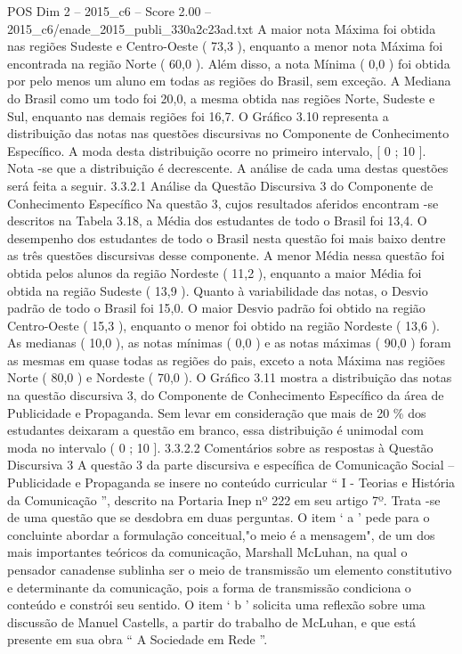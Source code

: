 \begin{textsample}{POS Dim 2 – 2015\_c6 – Score 2.00 – 2015\_c6/enade\_2015\_publi\_330a2c23ad.txt}
A maior nota Máxima foi obtida nas regiões Sudeste e Centro-Oeste ( 73,3 ), enquanto a menor nota Máxima foi encontrada na região Norte ( 60,0 ).
Além disso, a nota Mínima ( 0,0 ) foi obtida por pelo menos um aluno em todas as regiões do Brasil, sem exceção.
A Mediana do Brasil como um todo foi 20,0, a mesma obtida nas regiões Norte, Sudeste e Sul, enquanto nas demais regiões foi 16,7.
O Gráfico 3.10 representa a distribuição das notas nas questões discursivas no Componente de Conhecimento Específico.
A moda desta distribuição ocorre no primeiro intervalo, [ 0 ; 10 ].
Nota -se que a distribuição é decrescente.
A análise de cada uma destas questões será feita a seguir. 3.3.2.1 Análise da Questão Discursiva 3 do Componente de Conhecimento Específico Na questão 3, cujos resultados aferidos encontram -se descritos na Tabela 3.18, a Média dos estudantes de todo o Brasil foi 13,4.
O desempenho dos estudantes de todo o Brasil nesta questão foi mais baixo dentre as três questões discursivas desse componente.
A menor Média nessa questão foi obtida pelos alunos da região Nordeste ( 11,2 ), enquanto a maior Média foi obtida na região Sudeste ( 13,9 ).
Quanto à variabilidade das notas, o Desvio padrão de todo o Brasil foi 15,0.
O maior Desvio padrão foi obtido na região Centro-Oeste ( 15,3 ), enquanto o menor foi obtido na região Nordeste ( 13,6 ).
As medianas ( 10,0 ), as notas mínimas ( 0,0 ) e as notas máximas ( 90,0 ) foram as mesmas em quase todas as regiões do pais, exceto a nota Máxima nas regiões Norte ( 80,0 ) e Nordeste ( 70,0 ).
O Gráfico 3.11 mostra a distribuição das notas na questão discursiva 3, do Componente de Conhecimento Específico da área de Publicidade e Propaganda.
Sem levar em consideração que mais de 20 \% dos estudantes deixaram a questão em branco, essa distribuição é unimodal com moda no intervalo ( 0 ; 10 ]. 3.3.2.2 Comentários sobre as respostas à Questão Discursiva 3 A questão 3 da parte discursiva e específica de Comunicação Social – Publicidade e Propaganda se insere no conteúdo curricular “ I - Teorias e História da Comunicação ”, descrito na Portaria Inep nº 222 em seu artigo 7º.
Trata -se de uma questão que se desdobra em duas perguntas.
O item ‘ a ’ pede para o concluinte abordar a formulação conceitual,"o meio é a mensagem", de um dos mais importantes teóricos da comunicação, Marshall McLuhan, na qual o pensador canadense sublinha ser o meio de transmissão um elemento constitutivo e determinante da comunicação, pois a forma de transmissão condiciona o conteúdo e constrói seu sentido.
O item ‘ b ’ solicita uma reflexão sobre uma discussão de Manuel Castells, a partir do trabalho de McLuhan, e que está presente em sua obra “ A Sociedade em Rede ”.

\end{textsample}
